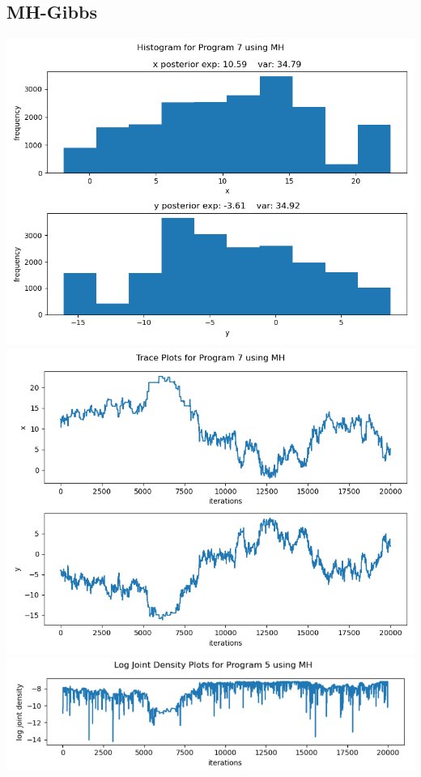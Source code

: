 \documentclass[10pt]{homeworg}
\begin{document}
\subsection{MH-Gibbs}
\begin{center}
\includegraphics[scale=0.5]{figures/MH_program_7.png}
\includegraphics[scale=0.5]{figures/trace_MH_program_7.png}
\includegraphics[scale=0.58]{figures/log_joint_MH_program_7.png}
\end{center}
\end{document}
